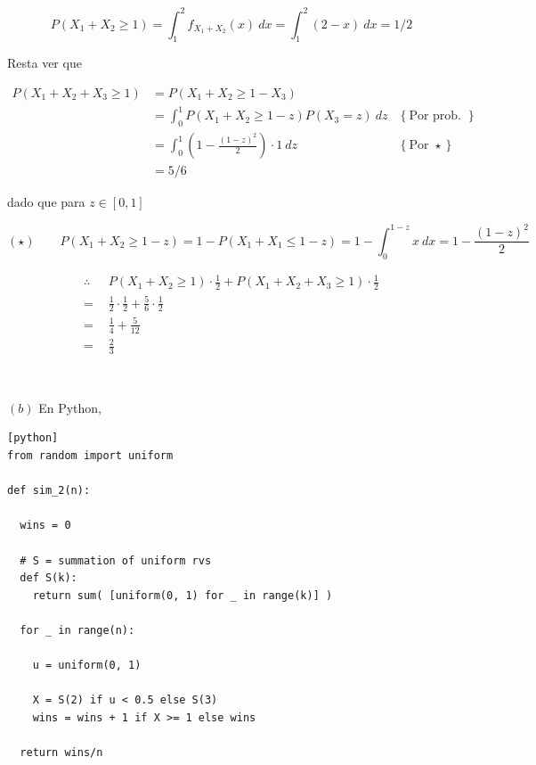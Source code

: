 \documentclass[a4paper, 12pt]{article}
\begin{document}
\begin{equation*}
  P(X_1 + X_2 \geq 1) = \int_1^2 f_{X_1 + X_2}(x) ~ dx = \int_1^2(2-x) ~ dx =
  1 / 2
\end{equation*}

Resta ver que 

\begin{align*}
  P(X_1 + X_2 + X_3 \geq 1) 
  &= P(X_1 + X_2 \geq 1 - X_3) \\ 
  &=\int_0^1  P(X_1 + X_2 \geq 1 - z) P(X_3 = z) ~ dz &\left\{ \text{Por prob.
  total} \right\} \\ 
  &=\int_0^1 \left(1 - \frac{(1-z)^2}{2}\right) \cdot 1 ~ dz &\left\{ \text{Por }
  \star\right\} \\ 
  &=5 / 6
\end{align*}

dado que para $z \in [0, 1]$

\begin{equation*}
  ( \star ) \qquad P(X_1 + X_2 \geq 1 - z) = 1 - P(X_1 + X_1 \leq 1 - z) = 1 - \int_0^{1-z} x ~ dx = 1 - \frac{ (1-z)^2 }{2}
\end{equation*}

\begin{align*}
  \therefore  ~ ~ ~
  &P(X_1 + X_2 \geq 1)\cdot \frac{1}{2} + P(X_1 + X_2 + X_3 \geq
  1)\cdot \frac{1}{2} \\
  = &\frac{1}{2} \cdot \frac{1}{2} + \frac{5}{6} \cdot
  \frac{1}{2}  \\
  = &\frac{1}{4} + \frac{5}{12} \\
  =&\frac{2}{3}
\end{align*}

~

$(b)$ En Python, 


\begin{verbatim}[python]
from random import uniform

def sim_2(n):

  wins = 0

  # S = summation of uniform rvs
  def S(k):
    return sum( [uniform(0, 1) for _ in range(k)] )

  for _ in range(n):

    u = uniform(0, 1)
 
    X = S(2) if u < 0.5 else S(3)
    wins = wins + 1 if X >= 1 else wins

  return wins/n
\end{verbatim}


\pagebreak 
\end{document}
